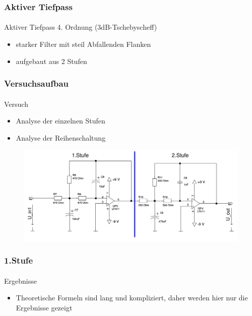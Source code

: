 \begin{frame}
\frametitle{Aktiver Tiefpass}
\framesubtitle{}
    \begin{block}{Aktiver Tiefpass 4. Ordnung (3dB-Tschebyscheff)}
         \begin{itemize}
             \item starker Filter mit steil Abfallenden Flanken
             \item aufgebaut aus 2 Stufen
         \end{itemize}
    \end{block}
\end{frame}
\begin{frame}
\frametitle{Versuchsaufbau}
\framesubtitle{}
    \begin{block}{Versuch}
        \begin{itemize}
            \item Analyse der einzelnen Stufen
            \item Analyse der Reihenschaltung
        \end{itemize}    
    \end{block}
    \begin{figure}[H]
    \begin{center}
            \includegraphics[scale=0.3]{./img/schaltung/tiefpass.png}
    \end{center}
    \end{figure}
\end{frame}

\begin{frame}
\frametitle{1.Stufe}
\framesubtitle{}
\begin{block}{Ergebnisse}
    \begin{itemize}
        \item Theoretische Formeln sind lang und kompliziert, daher werden hier
        nur die Ergebnisse gezeigt
    \end{itemize}
\end{block}
\end{frame}

